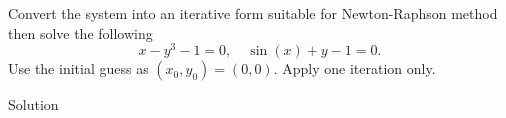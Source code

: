 \documentclass[11pt]{penrose}
\begin{document}
\begin{problem}{6}
    Convert the system into an iterative form suitable for Newton-Raphson method then solve the following
    \begin{equation*}
        x - y^3 - 1 = 0,
        \quad
        \sin(x) + y - 1 = 0.
    \end{equation*}
    Use the initial guess as $(x_0, y_0) = (0,0)$. Apply one iteration only.

    \solution Solution
\end{problem}
\end{document}
